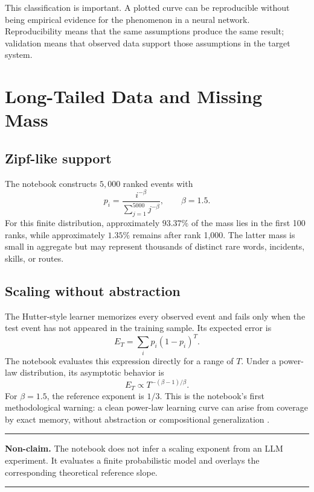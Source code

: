 \documentclass[10pt]{article}
\newenvironment{cautionbox}{%
  \begin{center}\begin{minipage}{0.94\textwidth}\color{deepred}\rule{\linewidth}{0.5pt}\par\vspace{0.3em}\noindent\textbf{Non-claim.} }%
  {\par\vspace{0.3em}\rule{\linewidth}{0.5pt}\end{minipage}\end{center}}
\begin{document}
This classification is important. A plotted curve can be reproducible without being empirical evidence for the phenomenon in a neural network. Reproducibility means that the same assumptions produce the same result; validation means that observed data support those assumptions in the target system.

\section{Long-Tailed Data and Missing Mass}

\subsection{Zipf-like support}

The notebook constructs $5{,}000$ ranked events with
\begin{equation}
  p_i = \frac{i^{-\beta}}{\sum_{j=1}^{5000}j^{-\beta}},
  \qquad \beta=1.5.
\end{equation}
For this finite distribution, approximately $93.37\%$ of the mass lies in the first 100 ranks, while approximately $1.35\%$ remains after rank 1,000. The latter mass is small in aggregate but may represent thousands of distinct rare words, incidents, skills, or routes.

\subsection{Scaling without abstraction}

The Hutter-style learner memorizes every observed event and fails only when the test event has not appeared in the training sample. Its expected error is
\begin{equation}
  E_T = \sum_i p_i(1-p_i)^T.
\end{equation}
The notebook evaluates this expression directly for a range of $T$. Under a power-law distribution, its asymptotic behavior is
\begin{equation}
  E_T \propto T^{-(\beta-1)/\beta}.
\end{equation}
For $\beta=1.5$, the reference exponent is $1/3$. This is the notebook's first methodological warning: a clean power-law learning curve can arise from coverage by exact memory, without abstraction or compositional generalization \citep{hutter2021learning}.

\begin{cautionbox}
The notebook does not infer a scaling exponent from an LLM experiment. It evaluates a finite probabilistic model and overlays the corresponding theoretical reference slope.
\end{cautionbox}
\end{document}
